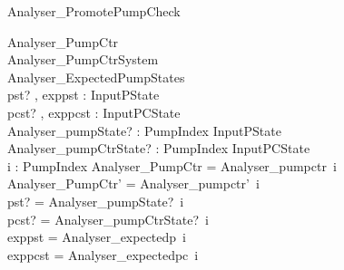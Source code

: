 \documentclass{article}
\begin{document}
\begin{schema}{Analyser\_PromotePumpCheck}

 \Delta Analyser\_PumpCtr \\
 \Delta Analyser\_PumpCtrSystem \\
 Analyser\_ExpectedPumpStates \\
 pst? , exppst : InputPState \\
 pcst? , exppcst : InputPCState \\
 Analyser\_pumpState? : PumpIndex \fun InputPState \\
 Analyser\_pumpCtrState? : PumpIndex \fun InputPCState \\
 i : PumpIndex 
\where
 \theta Analyser\_PumpCtr = Analyser\_pumpctr~i \\
 \theta Analyser\_PumpCtr' = Analyser\_pumpctr'~i \\
 pst? = Analyser\_pumpState?~i \\
 pcst? = Analyser\_pumpCtrState?~i \\
 exppst = Analyser\_expectedp~i \\
 exppcst = Analyser\_expectedpc~i
\end{schema}
\end{document}
